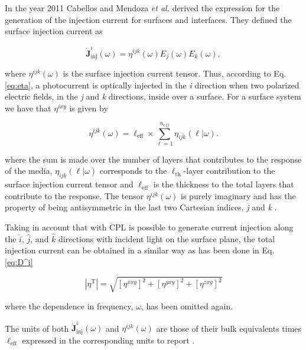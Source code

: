 \documentclass[aps,pra,11pt,tightenlines,showpacs,superscriptaddress,groupedaddress]{revtex4-1}
\newcommand{\ea}{$\eta^{ixy}$}
\begin{document}
In the year 2011 Cabellos and Mendoza \emph{et al.} \cite{cabellos2011optical}
derived the expression for the generation of the injection current for surfaces
and interfaces. They defined the surface injection current as

\begin{equation}
    \mathbf{\dot{J}}^{i}_{\text{inj}}(\omega) =
    \eta^{ijk}(\omega)E_{j}(\omega)E_{k}(\omega), \label{eq:eta}
\end{equation}

\noindent where $\eta^{ijk}(\omega)$ is the surface injection current tensor.
Thus, according to Eq. \ref{eq:eta}, a photocurrent is optically injected in
the \emph{i} direction when two polarized electric fields, in the \emph{j} and
\emph{k} directions, inside over a surface. For a surface system we have that
{\ea} is given by \cite{cabellos2011optical, arzate2014optical}

\begin{equation}
    \eta^{ijk} (\omega) = \ell_{\text{eff}} \times \sum_{\ell=1}^{n_{eff}}
    \eta_{ijk} (\ell|\omega). \label{eq:etaeff}
\end{equation}

\noindent where the sum is made over the number of layers that contributes to
the response of the media, $\eta_{ijk} (\ell|\omega)$ corresponds to the
$\ell_{\text{th}}$-layer contribution to the surface injection current tensor
and $\ell_{\text{eff}}$ is the thickness to the total layers that contribute to
the response. The tensor $\eta^{ijk}(\omega)$ is purely imaginary and has the
property of being antisymmetric in the last two Cartesian indices, \emph{j} and
\emph{k} \cite{sipe2000second,nastos2006optical}.

Taking in account that with CPL is possible to generate current injection
along the $\hat{i}$, $\hat{j}$, and $\hat{k}$ directions with incident light on
the surface plane, the total injection current can be obtained in a similar way
as has been done in Eq. \ref{eq:D^i}

\begin{equation*}
    |{\eta^{\text{T}}}| = \sqrt{ \left[ \eta^{xxy} \right]^{2} + \left[
    \eta^{yxy} \right]^{2} + \left[ \eta^{zxy} \right]^{2} }
\end{equation*}

\noindent where the dependence in frequency, $\omega$, has been omitted again.

The units of both $\mathbf{\dot{J}}^{i}_{\text{inj}}(\omega)$ and $\eta^{ijk}
(\omega)$  are those of their bulk equivalents times $\ell_{\text{eff}}$
expressed in the corresponding units to report \cite{cabellos2011optical}.
\end{document}
